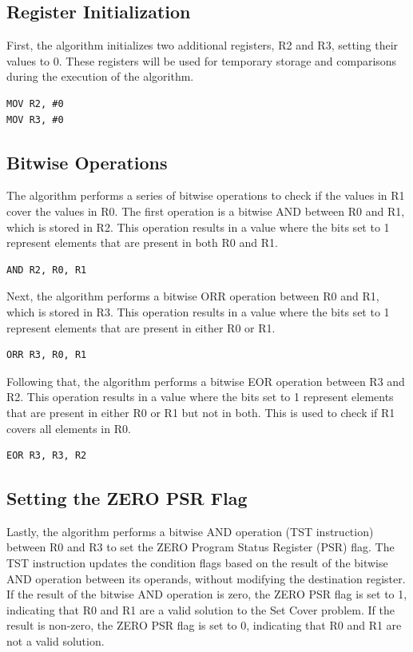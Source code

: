 \subsection{Register Initialization}
First, the algorithm initializes two additional registers, R2 and R3, setting their values to 0. These registers will be used for temporary storage and comparisons during the execution of the algorithm.

\begin{verbatim}
MOV R2, #0
MOV R3, #0
\end{verbatim}

\subsection{Bitwise Operations}
The algorithm performs a series of bitwise operations to check if the values in R1 cover the values in R0. The first operation is a bitwise AND between R0 and R1, which is stored in R2. This operation results in a value where the bits set to 1 represent elements that are present in both R0 and R1.

\begin{verbatim}
AND R2, R0, R1
\end{verbatim}

Next, the algorithm performs a bitwise ORR operation between R0 and R1, which is stored in R3. This operation results in a value where the bits set to 1 represent elements that are present in either R0 or R1.

\begin{verbatim}
ORR R3, R0, R1
\end{verbatim}

Following that, the algorithm performs a bitwise EOR operation between R3 and R2. This operation results in a value where the bits set to 1 represent elements that are present in either R0 or R1 but not in both. This is used to check if R1 covers all elements in R0.

\begin{verbatim}
EOR R3, R3, R2
\end{verbatim}

\subsection{Setting the ZERO PSR Flag}
Lastly, the algorithm performs a bitwise AND operation (TST instruction) between R0 and R3 to set the ZERO Program Status Register (PSR) flag. The TST instruction updates the condition flags based on the result of the bitwise AND operation between its operands, without modifying the destination register. If the result of the bitwise AND operation is zero, the ZERO PSR flag is set to 1, indicating that R0 and R1 are a valid solution to the Set Cover problem. If the result is non-zero, the ZERO PSR flag is set to 0, indicating that R0 and R1 are not a valid solution.

